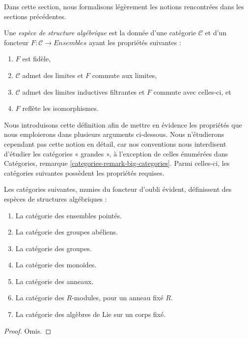 \noindent
Dans cette section, nous formalisons légèrement les notions rencontrées dans
les sections précédentes.

\begin{definition}
\label{definition-algebraic-structure}
Une {\it espèce de structure algébrique} est la donnée d'une catégorie
$\mathcal{C}$ et d'un foncteur $F : \mathcal{C} \to \textit{Ensembles}$ ayant les
propriétés suivantes :
\begin{enumerate}
\item $F$ est fidèle,
\item $\mathcal{C}$ admet des limites et $F$ commute aux limites,
\item $\mathcal{C}$ admet des limites inductives filtrantes et $F$ commute avec
celles-ci, et
\item $F$ reflète les isomorphismes.
\end{enumerate}
\end{definition}

\noindent
Nous introduisons cette définition afin de mettre en évidence les propriétés
que nous emploierons dans plusieurs arguments ci-dessous. Nous n'étudierons
cependant pas cette notion en détail, car nos conventions nous interdisent
d'étudier les catégories « grandes », à l'exception de celles énumérées dans
Catégories, remarque \ref{categories-remark-big-categories}.
Parmi celles-ci, les catégories suivantes possèdent les propriétés requises.

\begin{lemma}
\label{lemma-list-algebraic-structures}
Les catégories suivantes, munies du foncteur d'oubli évident, définissent des
espèces de structures algébriques :
\begin{enumerate}
\item La catégorie des ensembles pointés.
\item La catégorie des groupes abéliens.
\item La catégorie des groupes.
\item La catégorie des monoïdes.
\item La catégorie des anneaux.
\item La catégorie des $R$-modules, pour un anneau fixé $R$.
\item La catégorie des algèbres de Lie sur un corps fixé.
\end{enumerate}
\end{lemma}

\begin{proof}
Omis.
\end{proof}

